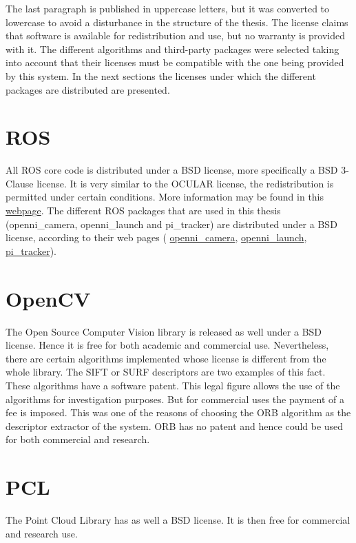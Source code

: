 	The last paragraph is published in uppercase letters, but it was converted to lowercase to avoid a disturbance in the structure of the thesis. 	
	The license claims that software is available for redistribution and use, but no warranty is provided with it. 
	The different algorithms and third-party packages were selected taking into account that their licenses must be compatible with the one being provided by this system. 
	In the next sections the licenses under which the different packages are distributed are presented. 


	\section{ROS}
	All ROS core code is distributed under a BSD license, more specifically a BSD 3-Clause license. 
	It is very similar to the OCULAR license, the redistribution is permitted under certain conditions. 
	More information may be found in this \href{http://opensource.org/licenses/BSD-3-Clause}{\color{blue} {webpage}}. 
	The different ROS packages that are used in this thesis (openni\_camera, openni\_launch and pi\_tracker) are distributed under a BSD license, according to their web pages ( \href{http://wiki.ros.org/openni_camera}{openni\_camera}, \href{http://wiki.ros.org/openni_launch}{openni\_launch}, \href{http://wiki.ros.org/pi_tracker}{pi\_tracker}).

	\section{OpenCV}
	The Open Source Computer Vision library is released as well under a BSD license. 
	Hence it is free for both academic and commercial use. 
	Nevertheless, there are certain algorithms implemented whose license is different from the whole library. 
	The SIFT or SURF descriptors are two examples of this fact. 
	These algorithms have a software patent. 
	This legal figure allows the use of the algorithms for investigation purposes. 
	But for commercial uses the payment of a fee is imposed. 
	This was one of the reasons of choosing the ORB algorithm as the descriptor extractor of the system. 
	ORB has no patent and hence could be used for both commercial and research. 

	\section{PCL}
	The Point Cloud Library has as well a BSD license. 
	It is then free for commercial and research use. 


